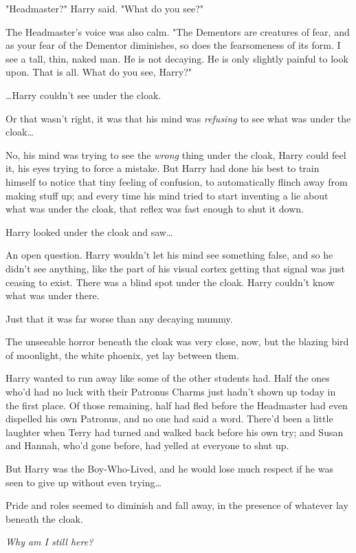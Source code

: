 "Headmaster?" Harry said. "What do you see?"

The Headmaster's voice was also calm. "The Dementors are creatures of fear, and 
as your fear of the Dementor diminishes, so does the fearsomeness of its form. 
I see a tall, thin, naked man. He is not decaying. He is only slightly painful 
to look upon. That is all. What do you see, Harry?"

{\ldots}Harry couldn't see under the cloak.

Or that wasn't right, it was that his mind was \emph{refusing} to see what was 
under the cloak{\ldots}

No, his mind was trying to see the \emph{wrong} thing under the cloak, Harry 
could feel it, his eyes trying to force a mistake. But Harry had done his best 
to train himself to notice that tiny feeling of confusion, to automatically 
flinch away from making stuff up; and every time his mind tried to start 
inventing a lie about what was under the cloak, that reflex was fast enough to 
shut it down.

Harry looked under the cloak and saw{\ldots}

An open question. Harry wouldn't let his mind see something false, and so he 
didn't see anything, like the part of his visual cortex getting that signal was 
just ceasing to exist. There was a blind spot under the cloak. Harry couldn't 
know what was under there.

Just that it was far worse than any decaying mummy.

The unseeable horror beneath the cloak was very close, now, but the blazing 
bird of moonlight, the white phoenix, yet lay between them.

Harry wanted to run away like some of the other students had. Half the ones 
who'd had no luck with their Patronus Charms just hadn't shown up today in the 
first place. Of those remaining, half had fled before the Headmaster had even 
dispelled his own Patronus, and no one had said a word. There'd been a little 
laughter when Terry had turned and walked back before his own try; and Susan 
and Hannah, who'd gone before, had yelled at everyone to shut up.

But Harry was the Boy-Who-Lived, and he would lose much respect if he was seen 
to give up without even trying{\ldots}

Pride and roles seemed to diminish and fall away, in the presence of whatever 
lay beneath the cloak.

\emph{Why am I still here?}

